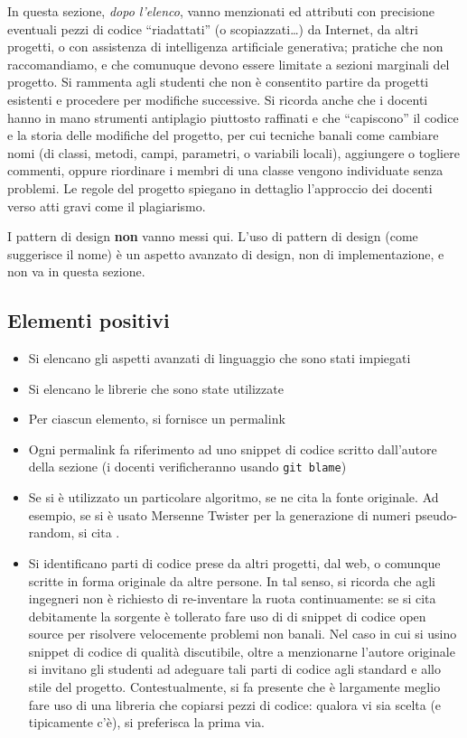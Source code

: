 \documentclass[a4paper,12pt]{report}
\begin{document}
In questa sezione, \textit{dopo l'elenco},
vanno menzionati ed attributi con precisione eventuali pezzi di codice ``riadattati'' (o scopiazzati\ldots)
da Internet, da altri progetti, o con assistenza di intelligenza artificiale generativa;
pratiche che non raccomandiamo, e che comunuque devono essere limitate a sezioni marginali del progetto.
%
Si rammenta agli studenti che non è consentito partire da progetti esistenti e procedere per modifiche successive.
%
Si ricorda anche che i docenti hanno in mano strumenti antiplagio piuttosto raffinati e che ``capiscono'' il codice e la storia delle modifiche del progetto,
per cui tecniche banali come cambiare nomi (di classi, metodi, campi, parametri, o variabili locali),
aggiungere o togliere commenti,
oppure riordinare i membri di una classe vengono individuate senza problemi.
%
Le regole del progetto spiegano in dettaglio l'approccio dei docenti verso atti gravi come il plagiarismo.

I pattern di design \textbf{non} vanno messi qui.
%
L'uso di pattern di design (come suggerisce il nome) è un aspetto avanzato di design, non di implementazione,
e non va in questa sezione.

\subsection*{Elementi positivi}

\begin{itemize}
	\item Si elencano gli aspetti avanzati di linguaggio che sono stati impiegati
	\item Si elencano le librerie che sono state utilizzate
	\item Per ciascun elemento, si fornisce un permalink
	\item Ogni permalink fa riferimento ad uno snippet di codice scritto dall'autore della sezione (i docenti verificheranno usando \texttt{git blame})
	\item Se si è utilizzato un particolare algoritmo, se ne cita la fonte originale.
	Ad esempio, se si è usato Mersenne Twister per la generazione di numeri pseudo-random, si cita \cite{mersenne}.
	\item Si identificano parti di codice prese da altri progetti, dal web, o comunque scritte in forma originale da altre persone.
	In tal senso, si ricorda che agli ingegneri non è richiesto di re-inventare la ruota continuamente:
	se si cita debitamente la sorgente è tollerato fare uso di di snippet di codice open source per risolvere velocemente problemi non banali.
	Nel caso in cui si usino snippet di codice di qualità discutibile,
	oltre a menzionarne l'autore originale si invitano gli studenti ad adeguare tali parti di codice agli standard e allo stile del progetto.
	Contestualmente, si fa presente che è largamente meglio fare uso di una libreria che copiarsi pezzi di codice:
	qualora vi sia scelta (e tipicamente c'è), si preferisca la prima via.
\end{itemize}
\end{document}
